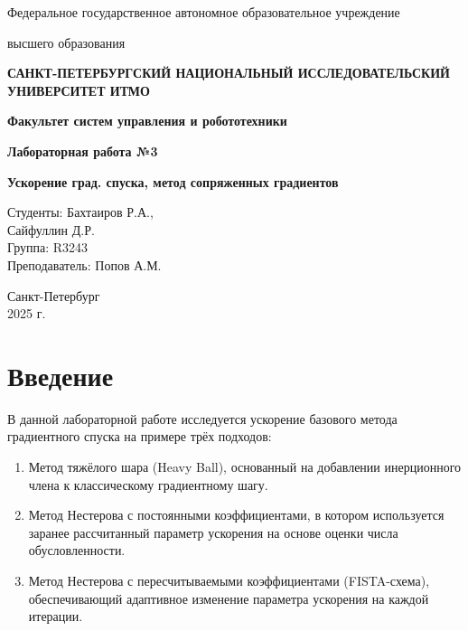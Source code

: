\documentclass[a4paper]{article}
\begin{document}
    

\begin{titlepage}
    \centering
    {\large Федеральное государственное автономное образовательное учреждение\par}
    {\large высшего образования\par}
    {\bfseries САНКТ-ПЕТЕРБУРГСКИЙ НАЦИОНАЛЬНЫЙ ИССЛЕДОВАТЕЛЬСКИЙ УНИВЕРСИТЕТ ИТМО\par}
    {\bfseries Факультет систем управления и робототехники\par}
    \vfill
    {\Large \bfseries Лабораторная работа №3\par}
    {\Large \bfseries Ускорение град. спуска, метод сопряженных градиентов \par}
    \vfill
    
    \begin{flushright}
        Студенты: Бахтаиров Р.А.,\\ Сайфуллин Д.Р. \\
        Группа:  R3243\\
        Преподаватель: Попов А.М.
    \end{flushright}
    \vfill
    Санкт-Петербург\\ 
    2025 г.
\end{titlepage}

\section{Введение}

В данной лабораторной работе исследуется ускорение базового метода градиентного спуска на примере трёх подходов:
\begin{enumerate}
    \item Метод тяжёлого шара (Heavy Ball), основанный на добавлении инерционного члена к классическому градиентному шагу.
    \item Метод Нестерова с постоянными коэффициентами, в котором используется заранее рассчитанный параметр ускорения на основе оценки числа обусловленности.
    \item Метод Нестерова с пересчитываемыми коэффициентами (FISTA-схема), обеспечивающий адаптивное изменение параметра ускорения на каждой итерации.
\end{enumerate}
\end{document}
